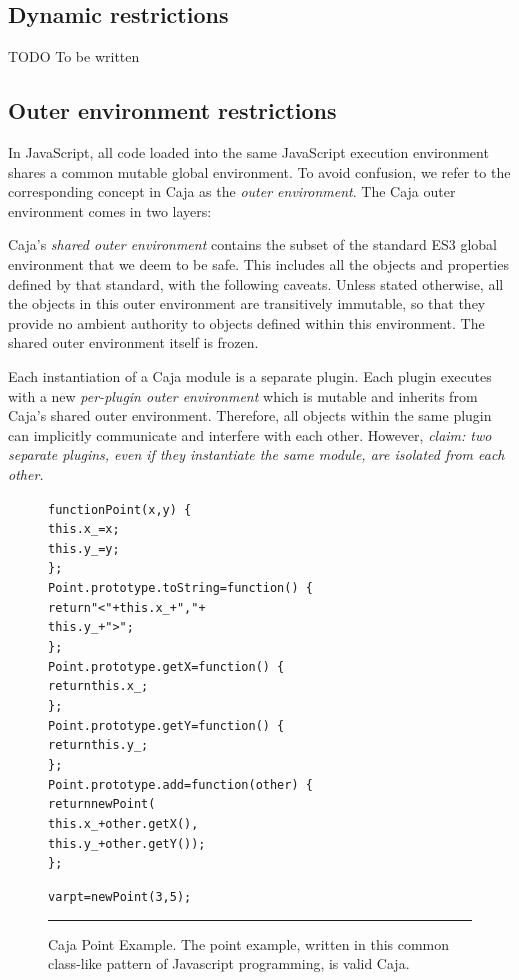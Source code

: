 \documentclass[letterpaper,twocolumn,10pt]{article}
\begin{document}
\subsection{Dynamic restrictions}

TODO To be written

\subsection{Outer environment restrictions}

In JavaScript, all code loaded into the same JavaScript execution environment 
shares a common mutable global environment. To avoid confusion, we refer to 
the corresponding concept in Caja as the \emph{outer environment}. The Caja 
outer environment comes in two layers:

Caja's \emph{shared outer environment} contains the subset of the standard 
ES3 global environment that we deem to be safe. This includes all the objects 
and properties defined by that standard, with the following caveats. Unless 
stated otherwise, all the objects in this outer environment are transitively 
immutable, so that they provide no ambient authority to objects defined 
within this environment. The shared outer environment itself is frozen.

Each instantiation of a Caja module is a separate plugin. Each plugin 
executes with a new \emph{per-plugin outer environment} which is mutable and 
inherits from Caja's shared outer environment. Therefore, all objects within 
the same plugin can implicitly communicate and interfere with each other. 
However, \emph{claim: two separate plugins, even if they instantiate the same 
module, are isolated from each other.}

\begin{figure}[t!]
\begin{alltt}
function Point(x, y)\ \{
  this.x\_ = x;
  this.y\_ = y;
\};
Point.prototype.toString = function()\ \{ 
  return "<" + this.x\_ + "," + 
               this.y\_ + ">"; 
\};
Point.prototype.getX = function()\ \{ 
  return this.x\_; 
\};
Point.prototype.getY = function()\ \{ 
  return this.y\_; 
\};
Point.prototype.add = function(other)\ \{
  return new Point(
    this.x\_ + other.getX(),
    this.y\_ + other.getY());
\};

var pt = new Point(3, 5);
\end{alltt}

\caption[Caja Point Example.]{Caja Point Example. The point example, written
in this common class-like pattern of Javascript programming, is valid Caja. 
\\ } \hrule
\label{fig:caja-point}
\end{figure}
\end{document}
